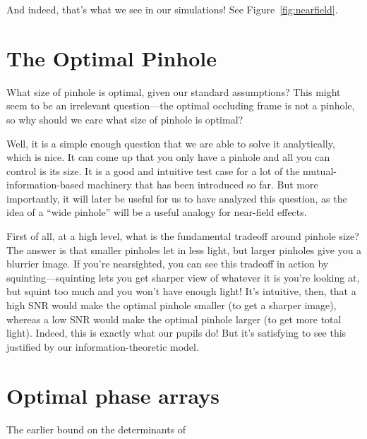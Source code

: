And indeed, that's what we see in our simulations! See Figure~\ref{fig:nearfield}.

\section{The Optimal Pinhole}

What size of pinhole is optimal, given our standard assumptions? This might seem to be an irrelevant question---the optimal occluding frame is not a pinhole, so why should we care what size of pinhole is optimal?

Well, it is a simple enough question that we are able to solve it analytically, which is nice. It can come up that you only have a pinhole and all you can control is its size. It is a good and intuitive test case for a lot of the mutual-information-based machinery that has been introduced so far. But more importantly, it will later be useful for us to have analyzed this question, as the idea of a ``wide pinhole'' will be a useful analogy for near-field effects.

First of all, at a high level, what is the fundamental tradeoff around pinhole size? The answer is that smaller pinholes let in less light, but larger pinholes give you a blurrier image. If you're nearsighted, you can see this tradeoff in action by squinting---squinting lets you get sharper view of whatever it is you're looking at, but squint too much and you won't have enough light! It's intuitive, then, that a high SNR would make the optimal pinhole smaller (to get a sharper image), whereas a low SNR would make the optimal pinhole larger (to get more total light). Indeed, this is exactly what our pupils do! But it's satisfying to see this justified by our information-theoretic model.



\section{Optimal phase arrays}

The earlier bound on the determinants of 